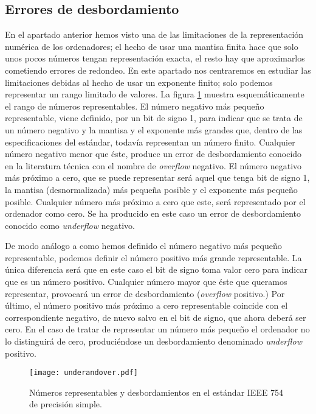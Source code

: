 \begin{paracol}{2}
\subsection{Errores de desbordamiento}
En el apartado anterior hemos visto una de las limitaciones de la representación numérica de los ordenadores; el hecho de usar una mantisa finita hace que solo unos pocos números tengan representación exacta, el resto hay que aproximarlos cometiendo errores de redondeo. En este apartado nos centraremos en estudiar las limitaciones debidas al hecho de usar un exponente finito; solo podemos representar un rango limitado de valores.
La figura \ref{fig:desbord} muestra esquemáticamente el rango de números representables. El número negativo más pequeño representable, viene definido, por un bit de signo 1, para indicar que se trata de un número negativo y la mantisa y el exponente más grandes que, dentro de las especificaciones del estándar, todavía representan un número finito. Cualquier número negativo menor que éste, produce un error de desbordamiento conocido en la literatura técnica con el nombre de \emph{overflow} negativo. El número negativo más próximo a cero, que se puede representar será aquel que tenga bit de signo 1, la mantisa (desnormalizada) más pequeña posible y el exponente más pequeño posible. Cualquier número más próximo a cero que este, será representado por el ordenador como cero. Se ha producido en este caso un error de desbordamiento conocido como \emph{underflow} negativo. 

De modo análogo a como hemos definido el número negativo más pequeño representable, podemos definir el número positivo más grande representable. La única diferencia será que en este caso el bit de signo toma valor cero para indicar que es un  número positivo. Cualquier número mayor que éste que queramos representar, provocará un error de desbordamiento (\emph{overflow} positivo.) Por último, el número positivo más próximo a cero representable coincide con el correspondiente negativo, de nuevo salvo en el bit de signo, que ahora deberá ser cero. En el caso de tratar de representar un número más pequeño el ordenador no lo distinguirá de cero, produciéndose un desbordamiento denominado \emph{underflow} positivo. 
\end{paracol}

\begin{figure}[h]
	\centering
		\texttt{[image: underandover.pdf]}
	\caption{Números representables y desbordamientos en el estándar IEEE 754 de precisión simple.}	
	\label{fig:desbord}
\end{figure}


